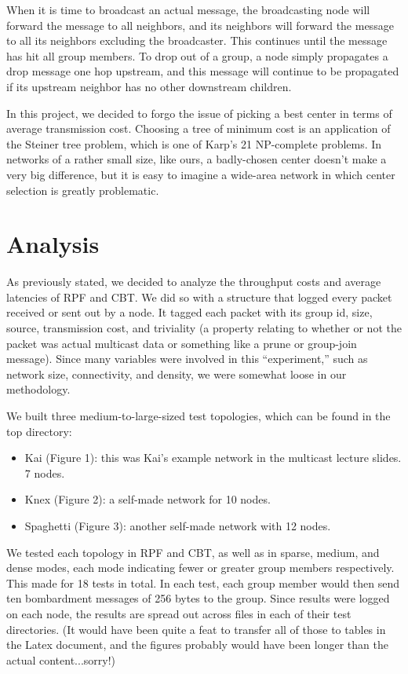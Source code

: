 \documentclass[11pt]{article}
\begin{document}
      When it is time to broadcast an actual message, the broadcasting node will forward the message to all neighbors, and its neighbors will forward the message to all its neighbors excluding the broadcaster. This continues until the message has hit all group members. To drop out of a group, a node simply propagates a drop message one hop upstream, and this message will continue to be propagated if its upstream neighbor has no other downstream children.
      
      In this project, we decided to forgo the issue of picking a best center in terms of average transmission cost. Choosing a tree of minimum cost is an application of the Steiner tree problem, which is one of Karp's 21 NP-complete problems. In networks of a rather small size, like ours, a badly-chosen center doesn't make a very big difference, but it is easy to imagine a wide-area network in which center selection is greatly problematic.
      
  \section{Analysis}
    As previously stated, we decided to analyze the throughput costs and average latencies of RPF and CBT. We did so with a structure that logged every packet received or sent out by a node. It tagged each packet with its group id, size, source, transmission cost, and triviality (a property relating to whether or not the packet was actual multicast data or something like a prune or group-join message). Since many variables were involved in this ``experiment,'' such as network size, connectivity, and density, we were somewhat loose in our methodology.
    
    We built three medium-to-large-sized test topologies, which can be found in the top directory:
    \begin{itemize}
      \item Kai (Figure 1): this was Kai's example network in the multicast lecture slides. 7 nodes.
      \item Knex (Figure 2): a self-made network for 10 nodes.
      \item Spaghetti (Figure 3): another self-made network with 12 nodes.
    \end{itemize}
    
    We tested each topology in RPF and CBT, as well as in sparse, medium, and dense modes, each mode indicating fewer or greater group members respectively. This made for 18 tests in total. In each test, each group member would then send ten bombardment messages of 256 bytes to the group. Since results were logged on each node, the results are spread out across files in each of their test directories. (It would have been quite a feat to transfer all of those to tables in the Latex document, and the figures probably would have been longer than the actual content...sorry!)
    
\end{document}
